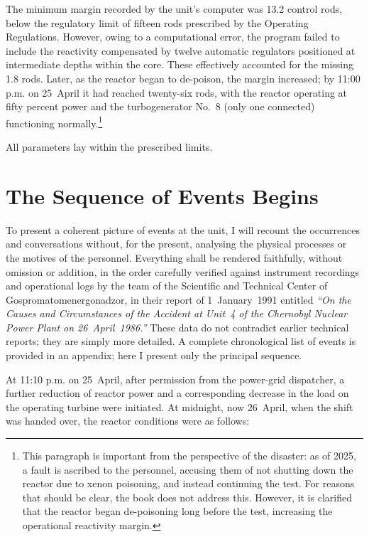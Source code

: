 \documentclass[openright]{bookest}
\begin{document}
The minimum margin recorded by the unit's computer was 13.2 control rods, below the regulatory limit of fifteen rods prescribed by the Operating Regulations. However, owing to a computational error, the program failed to include the reactivity compensated by twelve automatic regulators positioned at intermediate depths within the core. These effectively accounted for the missing \num{1.8} rods. Later, as the reactor began to de-poison, the margin increased; by 11:00 p.m. on 25~April it had reached twenty-six rods, with the reactor operating at fifty percent power and the turbogenerator No.~8 (only one connected) functioning normally.\footnote{This paragraph is important from the perspective of the disaster: as of 2025, a fault is ascribed to the personnel, accusing them of not shutting down the reactor due to xenon poisoning, and instead continuing the test. For reasons that should be clear, the book does not address this. However, it is clarified that the reactor began de-poisoning long before the test, increasing the operational reactivity margin.}

All parameters lay within the prescribed limits.

\section{The Sequence of Events Begins}

To present a coherent picture of events at the unit, I will recount the occurrences and conversations without, for the present, analysing the physical processes or the motives of the personnel. Everything shall be rendered faithfully, without omission or addition, in the order carefully verified against instrument recordings and operational logs by the team of the Scientific and Technical Center of Gospromatomenergonadzor, in their report of 1~January~1991 entitled \textit{``On the Causes and Circumstances of the Accident at Unit~4 of the Chernobyl Nuclear Power Plant on 26~April~1986.''} These data do not contradict earlier technical reports; they are simply more detailed. A complete chronological list of events is provided in an appendix; here I present only the principal sequence.

At 11:10 p.m. on 25~April, after permission from the power-grid dispatcher, a further reduction of reactor power and a corresponding decrease in the load on the operating turbine were initiated. At midnight, now 26~April, when the shift was handed over, the reactor conditions were as follows:
\end{document}
